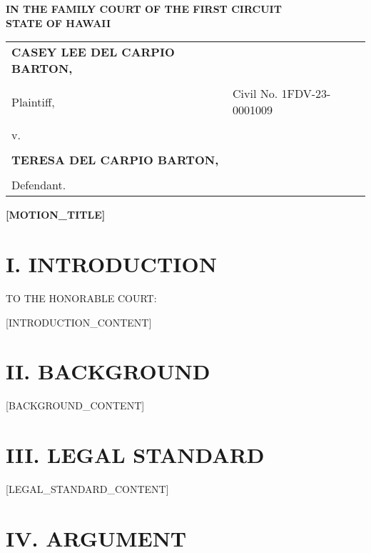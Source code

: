 \documentclass[12pt]{article}
\begin{document}
\begin{center}
\textbf{IN THE FAMILY COURT OF THE FIRST CIRCUIT}\\
\textbf{STATE OF HAWAI\textquotesingle I}\\
\vspace{0.5cm}
\begin{tabular}{ll}
\textbf{CASEY LEE DEL CARPIO BARTON,} & \\
 & \\
\hspace{2cm} Plaintiff, & Civil No. 1FDV-23-0001009 \\
 & \\
v. & \\
 & \\
\textbf{TERESA DEL CARPIO BARTON,} & \\
 & \\
\hspace{2cm} Defendant. &
\end{tabular}
\end{center}

\vspace{1cm}

\begin{center}
\textbf{[MOTION_TITLE]}
\end{center}

\vspace{0.5cm}

\section*{I. INTRODUCTION}

TO THE HONORABLE COURT:

[INTRODUCTION_CONTENT]

\section*{II. BACKGROUND}

[BACKGROUND_CONTENT]

\section*{III. LEGAL STANDARD}

[LEGAL_STANDARD_CONTENT]

\section*{IV. ARGUMENT}
\end{document}
